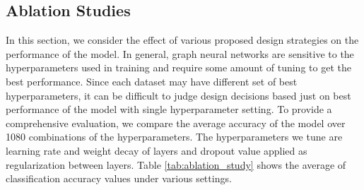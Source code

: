 \documentclass[sigconf,natbib=false]{acmart}
\begin{document}
\begin{table*}
\centering
\caption{Ablation study over 1080 different hyperparameter settings.}
\label{tab:ablation_study}
\end{table*}

\subsection{Ablation Studies}

In this section, we consider the effect of various proposed design strategies on the performance of the model. In general, graph neural networks are sensitive to the hyperparameters used in training and require some amount of tuning to get the best performance. Since each dataset may have different set of best hyperparameters, it can be difficult to judge design decisions based just on best performance of the model with single hyperparameter setting. To provide a comprehensive evaluation, we compare the average accuracy of the model over 1080 combinations of the hyperparameters. The hyperparameters we tune are learning rate and weight decay of layers and dropout value applied as regularization between layers.  Table \ref{tab:ablation_study} shows the average of classification accuracy values under various settings.
\end{document}
